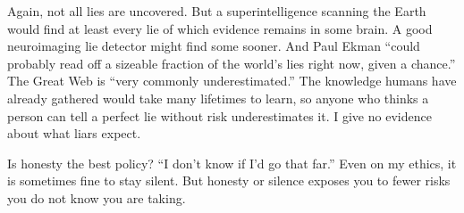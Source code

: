 Again, not all lies are uncovered. But a superintelligence scanning the Earth would find at least every lie of which evidence remains in some brain. A good neuroimaging lie detector might find some sooner. And Paul Ekman ``could probably read off a sizeable fraction of the world's lies right now, given a chance.''  The Great Web is ``very commonly underestimated.'' The knowledge humans have already gathered would take many lifetimes to learn, so anyone who thinks a person can tell a perfect lie without risk underestimates it. I give no evidence about what liars expect.

Is honesty the best policy? ``I don't know if I'd go that far.'' Even on my ethics, it is sometimes fine to stay silent. But honesty or silence exposes you to fewer risks you do not know you are taking.
